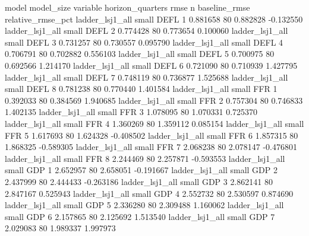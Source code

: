                    model model_size variable  horizon_quarters     rmse  n  baseline_rmse  relative_rmse_pct
         ladder_lsj1_all      small     DEFL                 1 0.881658 80       0.882828          -0.132550
         ladder_lsj1_all      small     DEFL                 2 0.774428 80       0.773654           0.100060
         ladder_lsj1_all      small     DEFL                 3 0.731257 80       0.730557           0.095790
         ladder_lsj1_all      small     DEFL                 4 0.706791 80       0.702882           0.556103
         ladder_lsj1_all      small     DEFL                 5 0.700975 80       0.692566           1.214170
         ladder_lsj1_all      small     DEFL                 6 0.721090 80       0.710939           1.427795
         ladder_lsj1_all      small     DEFL                 7 0.748119 80       0.736877           1.525688
         ladder_lsj1_all      small     DEFL                 8 0.781238 80       0.770440           1.401584
         ladder_lsj1_all      small      FFR                 1 0.392033 80       0.384569           1.940685
         ladder_lsj1_all      small      FFR                 2 0.757304 80       0.746833           1.402135
         ladder_lsj1_all      small      FFR                 3 1.078095 80       1.070331           0.725370
         ladder_lsj1_all      small      FFR                 4 1.360269 80       1.359112           0.085154
         ladder_lsj1_all      small      FFR                 5 1.617693 80       1.624328          -0.408502
         ladder_lsj1_all      small      FFR                 6 1.857315 80       1.868325          -0.589305
         ladder_lsj1_all      small      FFR                 7 2.068238 80       2.078147          -0.476801
         ladder_lsj1_all      small      FFR                 8 2.244469 80       2.257871          -0.593553
         ladder_lsj1_all      small      GDP                 1 2.652957 80       2.658051          -0.191667
         ladder_lsj1_all      small      GDP                 2 2.437999 80       2.444433          -0.263186
         ladder_lsj1_all      small      GDP                 3 2.862141 80       2.847167           0.525943
         ladder_lsj1_all      small      GDP                 4 2.552732 80       2.530597           0.874690
         ladder_lsj1_all      small      GDP                 5 2.336280 80       2.309488           1.160062
         ladder_lsj1_all      small      GDP                 6 2.157865 80       2.125692           1.513540
         ladder_lsj1_all      small      GDP                 7 2.029083 80       1.989337           1.997973
